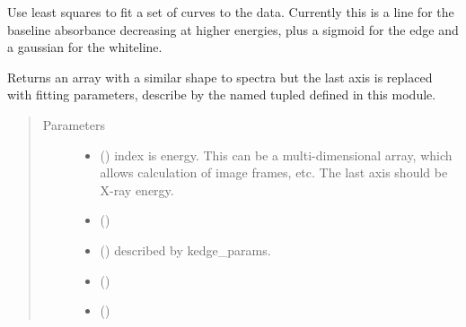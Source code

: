 \documentclass[letterpaper,10pt,english]{sphinxmanual}
\begin{document}
\begin{fulllineitems}
\label{\detokenize{xanespy:xanespy.xanes_math.fit_kedge}}
Use least squares to fit a set of curves to the data. Currently
this is a line for the baseline absorbance decreasing at higher
energies, plus a sigmoid for the edge and a gaussian for the
whiteline.

Returns an array with a similar shape to spectra but the last axis
is replaced with fitting parameters, describe by the named tupled
 defined in this module.
\begin{quote}\begin{description}
\item[{Parameters}] \leavevmode\begin{itemize}
\item {} 
 (\sphinxstyleliteralemphasis{-}) \textendash{} index is energy. This can be a multi-dimensional array, which
allows calculation of image frames, etc. The last axis should be
X-ray energy.

\item {} 
 (\sphinxstyleliteralemphasis{-}) \textendash{} 

\item {} 
 (\sphinxstyleliteralemphasis{-}) \textendash{} described by kedge\_params.

\item {} 
 (\sphinxstyleliteralemphasis{-}) \textendash{} 

\item {} 
 () \textendash{} 

\end{itemize}

\end{description}\end{quote}

\end{fulllineitems}

\end{document}
